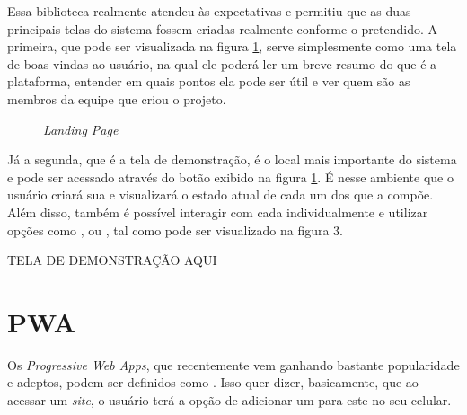 Essa biblioteca realmente atendeu às expectativas e permitiu que as duas principais telas do sistema fossem criadas realmente conforme o pretendido. A primeira, que pode ser visualizada na figura \ref{fig:landing_page}, serve simplesmente como uma tela de boas-vindas ao usuário, na qual ele poderá ler um breve resumo do que é a plataforma, entender em quais pontos ela pode ser útil e ver quem são as membros da equipe que criou o projeto.

\begin{figure}[H]
    \centering
    \caption{\textit{Landing Page}}
    \label{fig:landing_page}
\end{figure}

Já a segunda, que é a tela de demonstração, é o local mais importante do sistema e pode ser acessado através do botão  exibido na figura \ref{fig:landing_page}. É nesse ambiente que o usuário criará sua \dockerNetwork{} e visualizará o estado atual de cada um dos \containers{} que a compõe. Além disso, também é possível interagir com cada \conteiner{} individualmente e utilizar opções como ,  ou , tal como pode ser visualizado na figura 3.

{\huge TELA DE DEMONSTRAÇÃO AQUI}








\section{PWA}
\label{sec:pwa}

Os \textit{Progressive Web Apps}, que recentemente vem ganhando bastante popularidade e adeptos, podem ser definidos como \cite{Souza19} . Isso quer dizer, basicamente, que ao acessar um \textit{site}, o usuário terá a opção de adicionar um  para este no seu celular.


